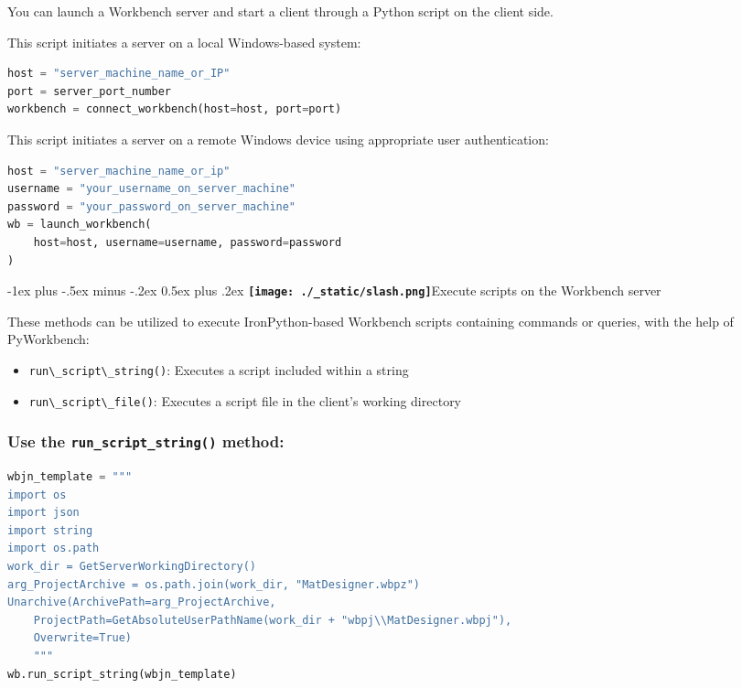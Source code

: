 \documentclass[
  9pt,
  landscape]{article}
\makeatletter
\newcommand{\passthrough}[1]{#1}
\providecommand{\tightlist}{%
  \setlength{\itemsep}{0pt}\setlength{\parskip}{0pt}}\usepackage{longtable,booktabs,array}
\renewcommand{\section}{\@startsection{section}{1}{0mm}%
                                {-1ex plus -.5ex minus -.2ex}%
                                {0.5ex plus .2ex}%
                                {\normalfont\Large\bfseries\texttt{[image: ./\_static/slash.png]}\hspace{0.3em}}}
\makeatother
\begin{document}
\begin{multicols}{3}
You can launch a Workbench server and start a client through a Python
script on the client side.

This script initiates a server on a local Windows-based system:

\begin{lstlisting}[language=Python]
host = "server_machine_name_or_IP"
port = server_port_number
workbench = connect_workbench(host=host, port=port)
\end{lstlisting}

This script initiates a server on a remote Windows device using
appropriate user authentication:

\begin{lstlisting}[language=Python]
host = "server_machine_name_or_ip"
username = "your_username_on_server_machine"
password = "your_password_on_server_machine"
wb = launch_workbench(
    host=host, username=username, password=password
)
\end{lstlisting}

\section{Execute scripts on the Workbench
server}\label{execute-scripts-on-the-workbench-server}

These methods can be utilized to execute IronPython-based Workbench
scripts containing commands or queries, with the help of PyWorkbench:

\begin{itemize}
\tightlist
\item
  \passthrough{\lstinline!run\_script\_string()!}: Executes a script
  included within a string
\item
  \passthrough{\lstinline!run\_script\_file()!}: Executes a script file
  in the client's working directory
\end{itemize}

\subsubsection{\texorpdfstring{Use the \texttt{run\_script\_string()}
method:}{Use the run\_script\_string() method:}}\label{use-the-run_script_string-method}

\begin{lstlisting}[language=Python]
wbjn_template = """
import os
import json
import string
import os.path
work_dir = GetServerWorkingDirectory()
arg_ProjectArchive = os.path.join(work_dir, "MatDesigner.wbpz")
Unarchive(ArchivePath=arg_ProjectArchive,
    ProjectPath=GetAbsoluteUserPathName(work_dir + "wbpj\\MatDesigner.wbpj"),
    Overwrite=True)
    """
wb.run_script_string(wbjn_template)
\end{lstlisting}


\end{multicols}
\end{document}

